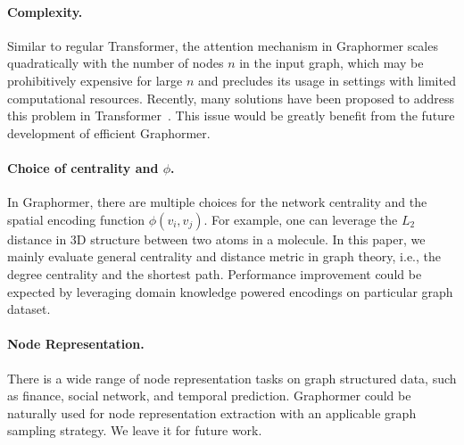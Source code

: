 \documentclass{article}
\begin{document}
\paragraph{Complexity.} Similar to regular Transformer, the attention mechanism in Graphormer scales quadratically with the number of nodes $n$ in the input graph, which may be prohibitively expensive for large $n$ and precludes its usage in settings with limited computational resources. Recently, many solutions have been proposed to address this problem in Transformer~\cite{ke2020rethinking,wang2020linformer,ying2021lazyformer,luo2021stable}. This issue would be greatly benefit from the future development of efficient Graphormer.

\paragraph{Choice of centrality and $\phi$.} In Graphormer, there are multiple choices for the network centrality and the spatial encoding function $\phi(v_i,v_j)$. For example, one can leverage the $L_2$ distance in 3D structure between two atoms in a molecule. In this paper, we mainly evaluate general centrality and distance metric in graph theory, i.e., the degree centrality and the shortest path. Performance improvement could be expected by leveraging domain knowledge powered encodings on particular graph dataset.

\paragraph{Node Representation.} There is a wide range of node representation tasks on graph structured data, such as finance, social network, and temporal prediction. Graphormer could be naturally used for node representation extraction with an applicable graph sampling strategy. We leave it for future work. 
\end{document}

